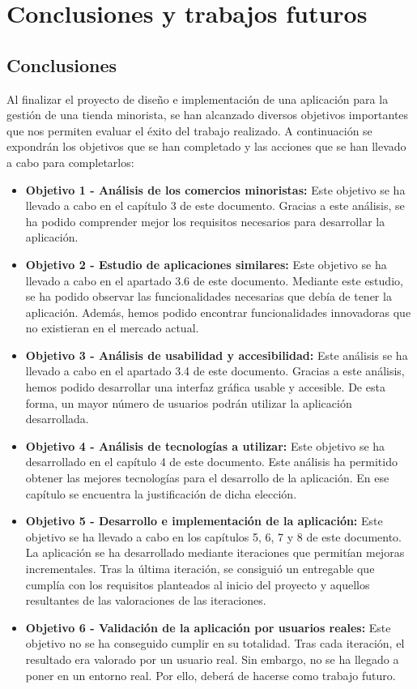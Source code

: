\chapter{Conclusiones y trabajos futuros}
\label{chap:conclusion}

\section{Conclusiones}

Al finalizar el proyecto de diseño e implementación de una aplicación para la gestión de una tienda minorista, se han alcanzado diversos objetivos importantes que nos permiten evaluar el éxito del trabajo realizado. A continuación se expondrán los objetivos que se han completado y las acciones que se han llevado a cabo para completarlos: 

\begin{itemize}
	\item \textbf{Objetivo 1 - Análisis de los comercios minoristas: } Este objetivo se ha llevado a cabo en el capítulo 3 de este documento. Gracias a este análisis, se ha podido comprender mejor los requisitos necesarios para desarrollar la aplicación. 
	\item \textbf{Objetivo 2 - Estudio de aplicaciones similares: } Este objetivo se ha llevado a cabo en el apartado 3.6 de este documento. Mediante este estudio, se ha podido observar las funcionalidades necesarias que debía de tener la aplicación. Además, hemos podido encontrar funcionalidades innovadoras que no existieran en el mercado actual. 
	\item \textbf{Objetivo 3 - Análisis de usabilidad y accesibilidad: } Este análisis se ha llevado a cabo en el apartado 3.4 de este documento. Gracias a este análisis, hemos podido desarrollar una interfaz gráfica usable y accesible. De esta forma, un mayor número de usuarios podrán utilizar la aplicación desarrollada. 
	\item \textbf{Objetivo 4 - Análisis de tecnologías a utilizar: } Este objetivo se ha desarrollado en el capítulo 4 de este documento. Este análisis ha permitido obtener las mejores tecnologías para el desarrollo de la aplicación. En ese capítulo se encuentra la justificación de dicha elección. 
	\item \textbf{Objetivo 5 - Desarrollo e implementación de la aplicación: } Este objetivo se ha llevado a cabo en los capítulos 5, 6, 7 y 8 de este documento. La aplicación se ha desarrollado mediante iteraciones que permitían mejoras incrementales. Tras la última iteración, se consiguió un entregable que cumplía con los requisitos planteados al inicio del proyecto y aquellos resultantes de las valoraciones de las iteraciones. 
	\item \textbf{Objetivo 6 - Validación de la aplicación por usuarios reales: } Este objetivo no se ha conseguido cumplir en su totalidad. Tras cada iteración, el resultado era valorado por un usuario real. Sin embargo, no se ha llegado a poner en un entorno real. Por ello, deberá de hacerse como trabajo futuro. 
\end{itemize}

